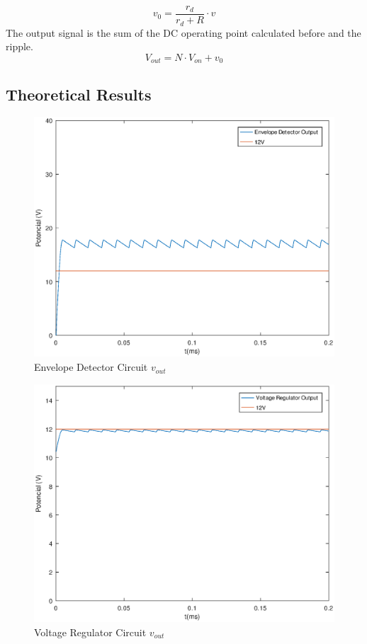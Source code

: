 \[
v_0 = \frac{r_d}{r_d+R}\cdot v
\]
The output signal is the sum of the DC operating point calculated before and the ripple.
\[
V_{out}=N \cdot V_{on} + v_0
\]


\subsection{Theoretical Results}
\label{subsec:res_the}

\begin{figure}[ht]
	\centering
	\includegraphics[width=1\linewidth]{envelope_detector.eps}
	\caption{Envelope Detector Circuit $v_{out}$}
\label{fig:EV_vout_a}
\end{figure}

\begin{figure}[ht]
	\centering
	\includegraphics[width=1\linewidth]{voltage_regulator.eps}
	\caption{Voltage Regulator Circuit $v_{out}$}
\label{fig:VR_vout_a}
\end{figure}

